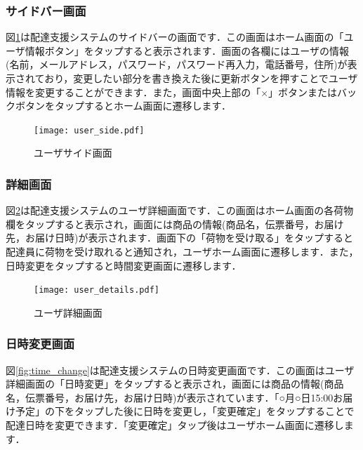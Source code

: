 \documentclass[a4j,titlepage]{jarticle}
\begin{document}
\subsubsection{サイドバー画面}
図\ref{fig:user_side}は配達支援システムのサイドバーの画面です．この画面はホーム画面の「ユーザ情報ボタン」をタップすると表示されます．画面の各欄にはユーザの情報(名前，メールアドレス，パスワード，パスワード再入力，電話番号，住所)が表示されており，変更したい部分を書き換えた後に更新ボタンを押すことでユーザ情報を変更することができます．また，画面中央上部の「×」ボタンまたはバックボタンをタップするとホーム画面に遷移します．

\begin{figure}[htbp]
 \begin{center}
  \texttt{[image: user\_side.pdf]}
	\caption{ユーザサイド画面}
	\label{fig:user_side}
 \end{center}

\end{figure}

\subsubsection{詳細画面}
図\ref{fig:user_details}は配達支援システムのユーザ詳細画面です．この画面はホーム画面の各荷物欄をタップすると表示され，画面には商品の情報(商品名，伝票番号，お届け先，お届け日時)が表示されます．画面下の「荷物を受け取る」をタップすると配達員に荷物を受け取れると通知され，ユーザホーム画面に遷移します．また，日時変更をタップすると時間変更画面に遷移します．
\begin{figure}[htbp]
 \begin{center}
  \texttt{[image: user\_details.pdf]}
	\caption{ユーザ詳細画面}
	\label{fig:user_details}
 \end{center}

\end{figure}

\subsubsection{日時変更画面}
図\ref{fig:time_change}は配達支援システムの日時変更画面です．この画面はユーザ詳細画面の「日時変更」をタップすると表示され，画面には商品の情報(商品名，伝票番号，お届け先，お届け日時)が表示されています．「○月○日15:00お届け予定」の下をタップした後に日時を変更し，「変更確定」をタップすることで配達日時を変更できます．「変更確定」タップ後はユーザホーム画面に遷移します．
\end{document}

